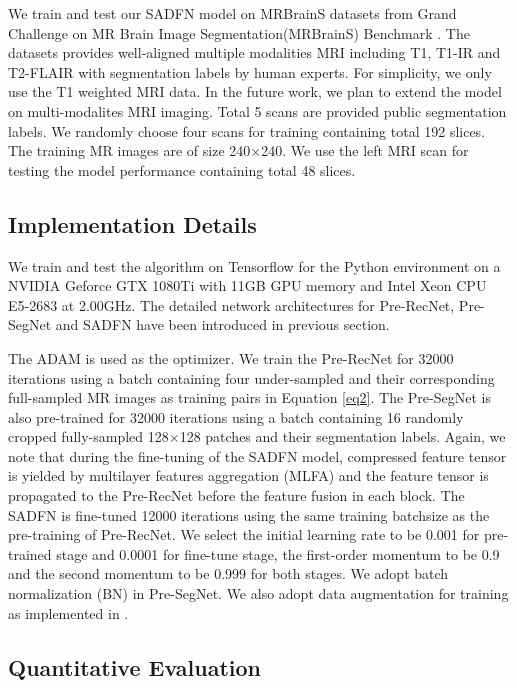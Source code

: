 \documentclass[runningheads]{llncs}
\begin{document}
We train and test our SADFN model on MRBrainS datasets from Grand Challenge on MR Brain Image Segmentation(MRBrainS) Benchmark \cite{29}. The datasets provides well-aligned multiple modalities MRI including T1, T1-IR and T2-FLAIR with segmentation labels by human experts. For simplicity, we only use the T1 weighted MRI data. In the future work, we plan to extend the model on multi-modalites MRI imaging. Total 5 scans are provided public segmentation labels. We randomly choose four scans for training containing total 192 slices. The training MR images are of size 240$\times$240. We use the left MRI scan for testing the model performance containing total 48 slices.

\subsection{Implementation Details}

We train and test the algorithm on Tensorflow for the Python environment on a NVIDIA Geforce GTX 1080Ti with 11GB GPU memory and Intel Xeon CPU E5-2683 at 2.00GHz. The detailed network architectures for Pre-RecNet, Pre-SegNet and SADFN have been introduced in previous section.

The ADAM is used as the optimizer. We train the Pre-RecNet for 32000 iterations using a batch containing four under-sampled and their corresponding full-sampled MR images as training pairs in Equation \ref{eq2}. The Pre-SegNet is also pre-trained for 32000 iterations using a batch containing 16 randomly cropped fully-sampled 128${\times}$128 patches and their segmentation labels. Again, we note that during the fine-tuning of the SADFN model, compressed feature tensor is yielded by multilayer features aggregation (MLFA) and the feature tensor is propagated to the Pre-RecNet before the feature fusion in each block. The SADFN is fine-tuned 12000 iterations using the same training batchsize as the pre-training of Pre-RecNet. We select the initial learning rate to be 0.001 for pre-trained stage and 0.0001 for fine-tune stage, the first-order momentum to be 0.9 and the second momentum to be 0.999 for both stages. We adopt batch normalization (BN) in Pre-SegNet. We also adopt data augmentation for training as implemented in \cite{30}.

\subsection{Quantitative Evaluation}
\end{document}
